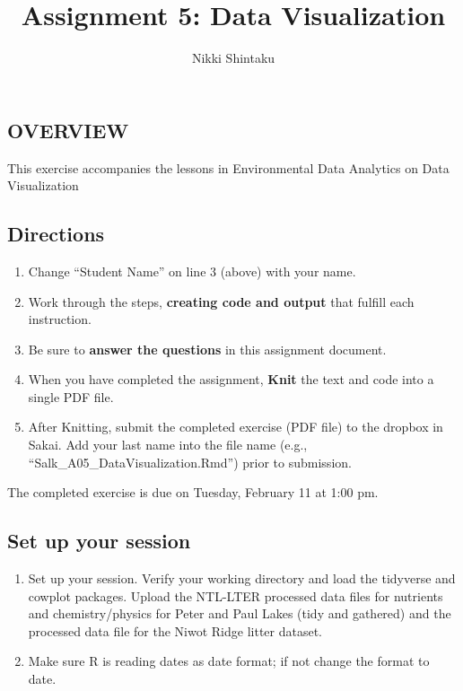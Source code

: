 \documentclass[]{article}
\title{Assignment 5: Data Visualization}
\author{Nikki Shintaku}
\date{}
\providecommand{\tightlist}{%
  \setlength{\itemsep}{0pt}\setlength{\parskip}{0pt}}
\begin{document}
\maketitle

\hypertarget{overview}{%
\subsection{OVERVIEW}\label{overview}}

This exercise accompanies the lessons in Environmental Data Analytics on
Data Visualization

\hypertarget{directions}{%
\subsection{Directions}\label{directions}}

\begin{enumerate}
\def\labelenumi{\arabic{enumi}.}
\tightlist
\item
  Change ``Student Name'' on line 3 (above) with your name.
\item
  Work through the steps, \textbf{creating code and output} that fulfill
  each instruction.
\item
  Be sure to \textbf{answer the questions} in this assignment document.
\item
  When you have completed the assignment, \textbf{Knit} the text and
  code into a single PDF file.
\item
  After Knitting, submit the completed exercise (PDF file) to the
  dropbox in Sakai. Add your last name into the file name (e.g.,
  ``Salk\_A05\_DataVisualization.Rmd'') prior to submission.
\end{enumerate}

The completed exercise is due on Tuesday, February 11 at 1:00 pm.

\hypertarget{set-up-your-session}{%
\subsection{Set up your session}\label{set-up-your-session}}

\begin{enumerate}
\def\labelenumi{\arabic{enumi}.}
\item
  Set up your session. Verify your working directory and load the
  tidyverse and cowplot packages. Upload the NTL-LTER processed data
  files for nutrients and chemistry/physics for Peter and Paul Lakes
  (tidy and gathered) and the processed data file for the Niwot Ridge
  litter dataset.
\item
  Make sure R is reading dates as date format; if not change the format
  to date.
\end{enumerate}
\end{document}
